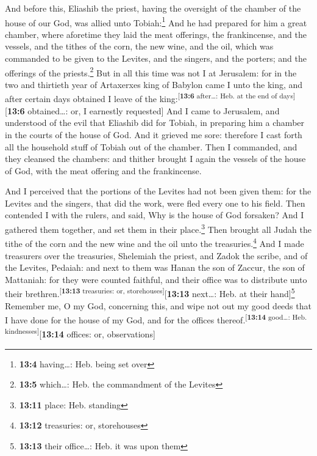  And before this, Eliashib the priest, having the
oversight of the chamber of the house of our God, was allied unto
Tobiah:\footnote{\textbf{13:4} having\ldots: Heb. being set over}
 And he had prepared for him a great chamber, where
aforetime they laid the meat offerings, the frankincense, and the
vessels, and the tithes of the corn, the new wine, and the oil, which
was commanded to be given to the Levites, and the singers, and the
porters; and the offerings of the priests.\footnote{\textbf{13:5}
  which\ldots: Heb. the commandment of the Levites}  But
in all this time was not I at Jerusalem: for in the two and thirtieth
year of Artaxerxes king of Babylon came I unto the king, and after
certain days obtained I leave of the
king:\textsuperscript{{[}\textbf{13:6} after\ldots: Heb. at the end of
days{]}}{[}\textbf{13:6} obtained\ldots: or, I earnestly requested{]}
 And I came to Jerusalem, and understood of the evil that
Eliashib did for Tobiah, in preparing him a chamber in the courts of the
house of God.  And it grieved me sore: therefore I cast
forth all the household stuff of Tobiah out of the chamber.
 Then I commanded, and they cleansed the chambers: and
thither brought I again the vessels of the house of God, with the meat
offering and the frankincense.

 And I perceived that the portions of the Levites had not
been given them: for the Levites and the singers, that did the work,
were fled every one to his field.  Then contended I with
the rulers, and said, Why is the house of God forsaken? And I gathered
them together, and set them in their place.\footnote{\textbf{13:11}
  place: Heb. standing}  Then brought all Judah the tithe
of the corn and the new wine and the oil unto the treasuries.\footnote{\textbf{13:12}
  treasuries: or, storehouses}  And I made treasurers
over the treasuries, Shelemiah the priest, and Zadok the scribe, and of
the Levites, Pedaiah: and next to them was Hanan the son of Zaccur, the
son of Mattaniah: for they were counted faithful, and their office was
to distribute unto their brethren.\textsuperscript{{[}\textbf{13:13}
treasuries: or, storehouses{]}}{[}\textbf{13:13} next\ldots: Heb. at
their hand{]}\footnote{\textbf{13:13} their office\ldots: Heb. it was
  upon them}  Remember me, O my God, concerning this, and
wipe not out my good deeds that I have done for the house of my God, and
for the offices thereof.\textsuperscript{{[}\textbf{13:14} good\ldots:
Heb. kindnesses{]}}{[}\textbf{13:14} offices: or, observations{]}

